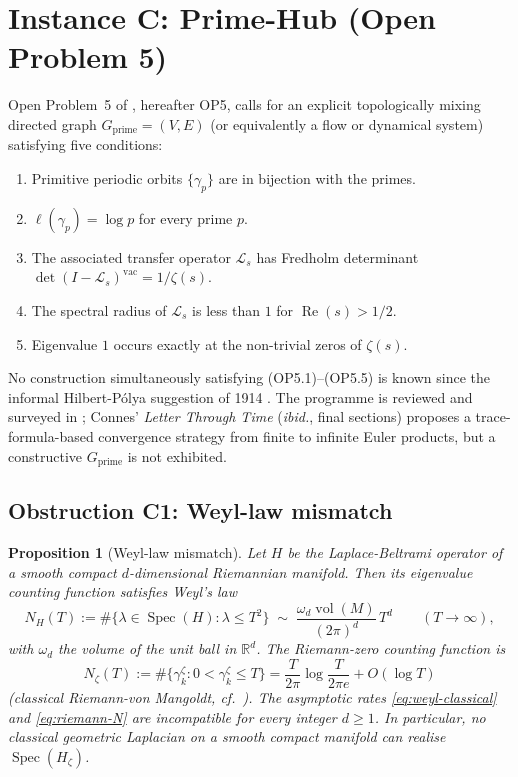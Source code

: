 \documentclass[11pt]{article}
\newtheorem{proposition}[theorem]{Proposition}
\theoremstyle{definition}
\theoremstyle{remark}
\newcommand{\Spec}{\operatorname{Spec}}
\renewcommand{\Re}{\operatorname{Re}}
\begin{document}
\section{Instance C: Prime-Hub (Open Problem 5)}
\label{sec:primehub}

Open Problem~5 of \cite{Geiger2026RHIII}, hereafter OP5, calls for an
explicit topologically mixing directed graph
$G_\mathrm{prime} = (V, E)$ (or equivalently a flow or dynamical system)
satisfying five conditions:
\begin{enumerate}
\item[(OP5.1)] Primitive periodic orbits $\{\gamma_p\}$ are in
  bijection with the primes.
\item[(OP5.2)] $\ell(\gamma_p) = \log p$ for every prime $p$.
\item[(OP5.3)] The associated transfer operator $\mathcal{L}_s$ has
  Fredholm determinant $\det(I - \mathcal{L}_s)^{\mathrm{vac}} =
  1/\zeta(s)$.
\item[(OP5.4)] The spectral radius of $\mathcal{L}_s$ is less than $1$
  for $\Re(s) > 1/2$.
\item[(OP5.5)] Eigenvalue $1$ occurs exactly at the non-trivial zeros
  of $\zeta(s)$.
\end{enumerate}
No construction simultaneously satisfying (OP5.1)--(OP5.5) is known
since the informal Hilbert-P\'olya suggestion of 1914
\cite{Polya1982letter}. The programme is reviewed and surveyed in
\cite{Connes2026}; Connes' \emph{Letter Through Time} (\emph{ibid.},
final sections) proposes a trace-formula-based convergence strategy
from finite to infinite Euler products, but a constructive
$G_\mathrm{prime}$ is not exhibited.

\subsection{Obstruction C1: Weyl-law mismatch}
\label{sec:obs-C1}

\begin{proposition}[Weyl-law mismatch]\label{prop:weyl-obstruction}
Let $H$ be the Laplace-Beltrami operator of a smooth compact
$d$-dimensional Riemannian manifold. Then its eigenvalue counting
function satisfies Weyl's law
\begin{equation}
\label{eq:weyl-classical}
  N_H(T) := \#\{\lambda \in \Spec(H) : \lambda \leq T^2\}
  \;\sim\; \frac{\omega_d \operatorname{vol}(M)}{(2\pi)^d}\,T^d
  \qquad (T \to \infty),
\end{equation}
with $\omega_d$ the volume of the unit ball in $\mathbb{R}^d$. The
Riemann-zero counting function is
\begin{equation}
\label{eq:riemann-N}
  N_\zeta(T) := \#\{\gamma_k^\zeta : 0 < \gamma_k^\zeta \leq T\}
  =
  \frac{T}{2\pi}\log\!\frac{T}{2\pi e} + O(\log T)
\end{equation}
(classical Riemann-von Mangoldt, cf.\ \cite[\S9.4]{Titchmarsh1986}).
The asymptotic rates \eqref{eq:weyl-classical} and
\eqref{eq:riemann-N} are incompatible for every integer $d \geq 1$.
In particular, no classical geometric Laplacian on a smooth compact
manifold can realise $\Spec(H_\zeta)$.
\end{proposition}
\end{document}
